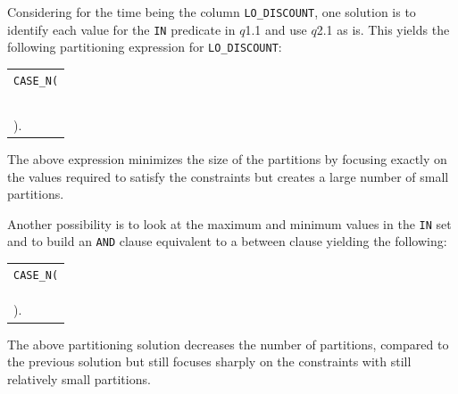 \documentclass[runningheads]{comsis2}
\begin{document}
Considering for the time being the column {\tt LO\_DISCOUNT}, 
one solution is to identify each value 
for the {\tt IN} predicate in $q$1.1 
and use $q$2.1 as is. This yields the following partitioning expression 
for {\tt LO\_DISCOUNT}:
\vspace{-.05in}
\begin{center}
{\footnotesize
\begin{tabular}{l}
{\tt CASE\_N(} \\
\hspace{0.1in}{\tt LO\_DISCOUNT = 1,} \\
\hspace{0.1in}{\tt LO\_DISCOUNT = 4,} \\
\hspace{0.1in}{\tt LO\_DISCOUNT = 5,} \\
\hspace{0.1in}{\tt LO\_DISCOUNT >= 7,} \\
\hspace{0.1in}{\tt NO CASE OR UNKNOWN} \\
{)}. \\
\end{tabular}
}
\end{center}
The above expression minimizes the size of the partitions 
by focusing exactly on the values required to satisfy the constraints 
but creates a large number of small partitions. 

Another possibility is to look at the maximum and minimum 
values in the {\tt IN} set and to build an {\tt AND} clause equivalent to 
a between clause yielding the following:
\vspace{-.1in}
\begin{center}
\begin{tabular}{l}
{\tt CASE\_N(} \\
\hspace{0.1in}{\tt LO\_DISCOUNT >= 1 AND LO\_DISCOUNT <= 5,} \\
\hspace{0.1in}{\tt LO\_DISCOUNT >= 7,} \\
\hspace{0.1in}{\tt NO CASE OR UNKNOWN} \\
{)}. \\
\end{tabular}
\vspace{-.1in}
\end{center}

\noindent The above partitioning solution decreases the number of partitions, 
compared to the previous solution but still focuses sharply on the constraints 
with still relatively small partitions. 
\end{document}
